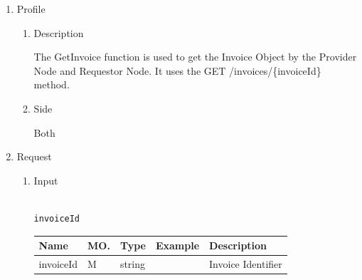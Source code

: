 \begin{enumerate}

\item Profile

\begin{enumerate}

\item Description

The GetInvoice function is used to get the Invoice Object by the Provider Node and Requestor Node. 
It uses the GET /invoices/\{invoiceId\} method.
 
\item Side

Both

\end{enumerate}

\item Request

\begin{enumerate}

\item Input

\begin{tcolorbox}[boxrule=0pt, frame empty]
\begin{verbatim}

invoiceId

\end{verbatim}
\end{tcolorbox}


\begin{table}[H]
\footnotesize

\begin{center}
\begin{tabular}{|p{3cm}|l|p{3cm}|p{3cm}|p{4cm}|} 
\hline
\rowcolor{lightgray}	Name	& MO.	& Type	& Example & 	Description \\
\hline

invoiceId				& M	& 	string				&								&	Invoice Identifier \\ 
\hline



\end{tabular}
\end{center}
\end{table}
\end{enumerate}
\end{enumerate}
